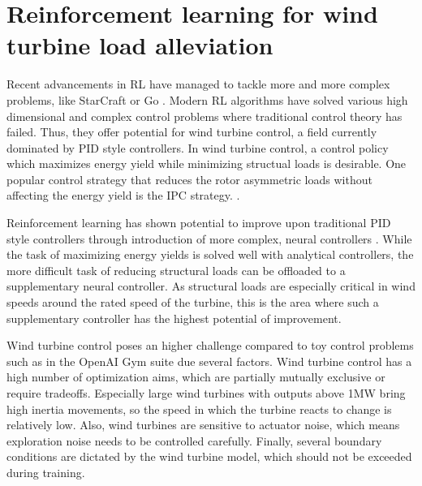 \documentclass{article}
\begin{document}
\section{Reinforcement learning for wind turbine load alleviation}

Recent advancements in \ac{RL} have managed to tackle more and more complex problems, like StarCraft \cite{vinyalsGrandmasterLevelStarCraft2019} or Go \cite{silverMasteringGameGo2016}. Modern \ac{RL} algorithms \cite{haarnojaSoftActorCriticOffPolicy2018} \cite{schulmanProximalPolicyOptimization2017} \cite{fujimotoAddressingFunctionApproximation2018} have solved various high dimensional and complex control problems where traditional control theory has failed. Thus, they offer potential for wind turbine control, a field currently dominated by \ac{PID} style controllers. In wind turbine control, a control policy which maximizes energy yield while minimizing structual loads is desirable. One popular control strategy that reduces the rotor asymmetric loads without affecting the energy yield is the \ac{IPC} strategy. \cite{bossanyiIndividualBladePitch2003} \cite{bossanyiFurtherLoadReductions2005}.

Reinforcement learning has shown potential to improve upon traditional \ac{PID} style controllers through introduction of more complex, neural controllers \cite{coqueletBiomimeticIndividualPitch2020} \cite{tominIntelligentControlWind2019}. While the task of maximizing energy yields is solved well with analytical controllers, the more difficult task of reducing structural loads can be offloaded to a supplementary neural controller. As structural loads are especially critical in wind speeds around the rated speed of the turbine, this is the area where such a supplementary controller has the highest potential of improvement.

Wind turbine control poses an higher challenge compared to toy control problems such as in the OpenAI Gym suite \cite{brockmanOpenAIGym2016} due several factors.
Wind turbine control has a high number of optimization aims, which are partially mutually exclusive or require tradeoffs. Especially large wind turbines with outputs above 1MW bring high inertia movements, so the speed in which the turbine reacts to change is relatively low. Also, wind turbines are sensitive to actuator noise, which means exploration noise needs to be controlled carefully. Finally, several boundary conditions are dictated by the wind turbine model, which should not be exceeded during training.
\end{document}

